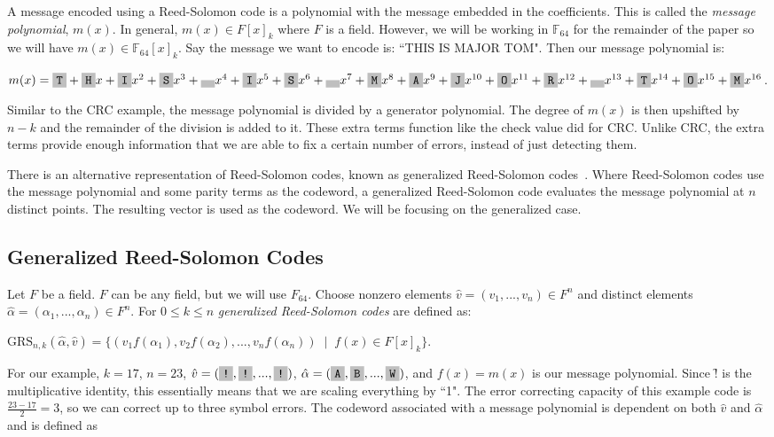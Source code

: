 \documentclass{article}
\begin{document}
A message encoded using a Reed-Solomon code is a polynomial with the message embedded in the coefficients. This is called the \textit{message polynomial}, $m(x)$. In general, $m(x) \in F[x]_{k}$ where $F$ is a field. However, we will be working in $\mathbb{F}_{64}$ for the remainder of the paper so we will have $m(x) \in \mathbb{F}_{64}[x]_{k}$. Say the message we want to encode is: ``THIS IS MAJOR TOM". Then our message polynomial is:
\begin{center}
$m(x) = \f{T} + \f{H}x + \f{I}x^{2} + \f{S}x^{3} + \f{ }x^{4} + \f{I}x^{5} + \f{S}x^{6} + \f{ }x^{7} + \f{M}x^{8} + \f{A}x^{9} + \f{J}x^{10} + \f{O}x^{11} + \f{R}x^{12} + \f{ }x^{13} + \f{T}x^{14} + \f{O}x^{15} + \f{M}x^{16}$.
\end{center}

Similar to the CRC example, the message polynomial is divided by a generator polynomial. The degree of $m(x)$ is then upshifted by $n - k$ and the remainder of the division is added to it. These extra terms function like the check value did for CRC. Unlike CRC, the extra terms provide enough information that we are able to fix a certain number of errors, instead of just detecting them.

There is an alternative representation of Reed-Solomon codes, known as generalized Reed-Solomon codes~\cite{Hall:2012}. Where Reed-Solomon codes use the message polynomial and some parity terms as the codeword, a generalized Reed-Solomon code evaluates the message polynomial at $n$ distinct points. The resulting vector is used as the codeword. We will be focusing on the generalized case.

\subsection{Generalized Reed-Solomon Codes}
Let $F$ be a field. $F$ can be any field, but we will use $F_{64}$. Choose nonzero elements $\hat{v} = (v_{1},..., v_{n}) \in F^{n}$ and distinct elements $\hat{\alpha} = (\alpha_{1},...,\alpha_{n}) \in F^{n}$. For $0 \le k \le n$ \textit{generalized Reed-Solomon codes} are defined as:
\begin{center}
$\text{GRS}_{n,k}(\hat{\alpha}, \hat{v}) = \{(v_{1}f(\alpha_{1}),v_{2}f(\alpha_{2}),...,v_{n}f(\alpha_{n}))\;\mid\;f(x) \in F[x]_{k}\}$.
\end{center}

For our example, $k = 17$, $n=23$, $\hat{v} = (\f{!}, \f{!}, ..., \f{!})$, $\hat{\alpha} = (\f{A}, \f{B}, ..., \f{W})$, and $f(x) = m(x)$ is our message polynomial. Since \f{!} is the multiplicative identity, this essentially means that we are scaling everything by ``1". The error correcting capacity of this example code is $\frac{23 - 17}{2} = 3$, so we can correct up to three symbol errors. The codeword associated with a message polynomial is dependent on both $\hat{v}$ and $\hat{\alpha}$ and is defined as
\end{document}
